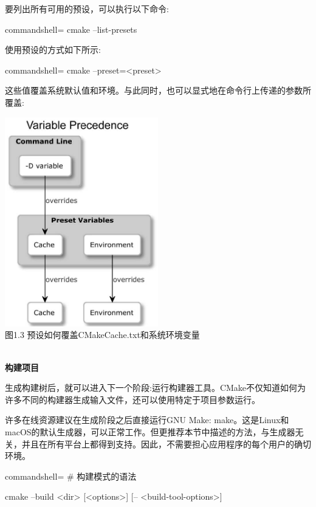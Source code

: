 要列出所有可用的预设，可以执行以下命令:

\begin{tcblisting}{commandshell={}}
cmake --list-presets
\end{tcblisting}

使用预设的方式如下所示:

\begin{tcblisting}{commandshell={}}
cmake --preset=<preset>
\end{tcblisting}

这些值覆盖系统默认值和环境。与此同时，也可以显式地在命令行上传递的参数所覆盖:

\begin{center}
\includegraphics[width=0.5\textwidth]{content/1/chapter1/images/3.jpg}\\
图1.3 预设如何覆盖CMakeCache.txt和系统环境变量
\end{center}

\hspace*{\fill} \\ %
\noindent
\textbf{构建项目}

生成构建树后，就可以进入下一个阶段:运行构建器工具。CMake不仅知道如何为许多不同的构建器生成输入文件，还可以使用特定于项目参数运行。

\begin{tcolorbox}[colback=red!5!white,colframe=red!75!black,title=不推荐]
许多在线资源建议在生成阶段之后直接运行GNU Make: make。这是Linux和macOS的默认生成器，可以正常工作。但更推荐本节中描述的方法，与生成器无关，并且在所有平台上都得到支持。因此，不需要担心应用程序的每个用户的确切环境。
\end{tcolorbox}

\begin{tcblisting}{commandshell={}}
# 构建模式的语法

cmake --build <dir> [<options>] [-- <build-tool-options>]
\end{tcblisting}

